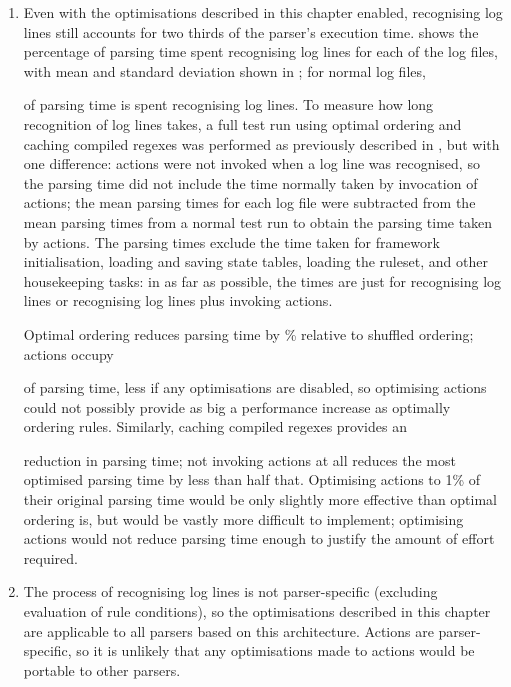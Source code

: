 \begin{enumerate}

    \item Even with the optimisations described in this chapter enabled,
        recognising log lines still accounts for two thirds of the parser's
        execution time.   shows the percentage of parsing time
        spent recognising log lines for each of the \numberOFlogFILES{} log
        files, with mean and standard deviation shown in
        ; for normal log files,
        
        of parsing time is spent recognising log lines.  To measure how
        long recognition of log lines takes, a full test run using optimal
        ordering and caching compiled regexes was performed as previously
        described in , but with one
        difference: actions were not invoked when a log line was
        recognised, so the parsing time did not include the time normally
        taken by invocation of actions; the mean parsing times for each log
        file were subtracted from the mean parsing times from a normal test
        run to obtain the parsing time taken by actions.  The parsing times
        exclude the time taken for framework initialisation, loading and
        saving state tables, loading the ruleset, and other housekeeping
        tasks: in as far as possible, the times are just for recognising
        log lines or recognising log lines plus invoking actions.

        Optimal ordering reduces parsing time by
        \%
        relative to shuffled ordering; actions occupy
        
        of parsing time, less if any optimisations are disabled, so
        optimising actions could not possibly provide as big a performance
        increase as optimally ordering rules.  Similarly, caching compiled
        regexes provides an
        
        reduction in parsing time; not invoking actions at all reduces the
        most optimised parsing time by less than half that.  Optimising
        actions to 1\% of their original parsing time would be only
        slightly more effective than optimal ordering is, but would be
        vastly more difficult to implement; optimising actions would not
        reduce parsing time enough to justify the amount of effort
        required.

    \item The process of recognising log lines is not parser-specific
        (excluding evaluation of rule conditions), so the optimisations
        described in this chapter are applicable to all parsers based on
        this architecture.  Actions are parser-specific, so it is unlikely
        that any optimisations made to actions would be portable to other
        parsers.

\end{enumerate}

